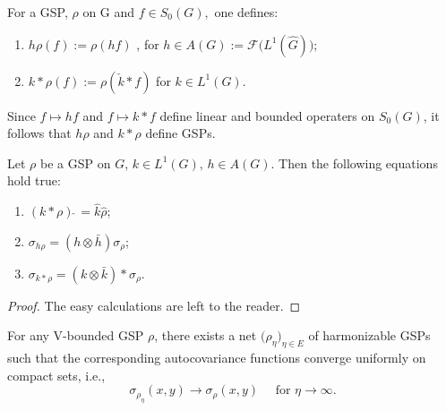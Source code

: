 \documentclass[graybox]{svmult}
\begin{document}
\begin{definition}\label{ch18:def10}
For a   GSP, $\rho$ on G  and $ f \in {S_{0}(G)},$ one defines:
\begin{enumerate}
\item[(a)] $h\rho (f) := \rho (hf) $ , for
 $h \in A(G) := \mathcal{F}\bigl( L^{1}(\hat{G})\bigr)$;

\item[(b)] $k\ast {}\rho (f) := \rho (\check{k}\ast {}f) $ for
$ k \in L^{1}(G)$.
\end{enumerate}
\end{definition}

\begin{rem}
Since $ f \mapsto hf $ and $ f \mapsto
k\ast f $ define linear and bounded operaters on $ {S_{0}(G)} $, it follows
that $h\rho $ and $k\ast {}\rho $ define GSPs.
\end{rem}

\setcounter{lemma}{15}
\begin{lemma}\label{ch18:lem16}
Let $\rho $ be a GSP on $G$, $k \in
L^{1}(G), \, h \in A(G)$. Then the following equations hold true:
\begin{enumerate}
\item[(a)] $(k\ast {}\rho ) \hat{\;} = \hat{k}\hat{\rho}$;

\item[(b)] $\sigma_{h\rho} = (h\otimes \bar{h})\sigma _{\rho} $;

\item[(c)] $\sigma_{k\ast {}\rho } = (k\otimes \bar{k})\ast {}{\sigma_{ \rho}}$.
\end{enumerate}
\end{lemma}

\begin{proof}
The easy calculations are left to the reader.
\end{proof}

\setcounter{theorem}{16}
\begin{theorem}\label{ch18:the17}
For any V-bounded GSP $ \rho $, there exists a net
$\bigl( \rho _{\eta }\bigr) _{\eta \in E}$ of harmonizable GSPs such
that the corresponding autocovariance functions converge
uniformly on compact sets, i.e.,   %
%
\[
  \sigma_{\rho_{\eta }}(x,y) \rightarrow {\sigma_{ \rho}}(x,y)
 \quad  \text{ for } \eta \rightarrow \infty.
\]

\end{theorem}
\end{document}
